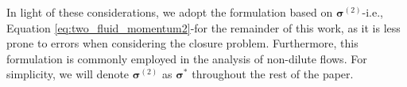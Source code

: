 
In light of these considerations, we adopt the formulation based on $\bm \sigma^{(2)}$-i.e., Equation \ref{eq:two_fluid_momentum2}-for the remainder of this work, as it is less prone to errors when considering the closure problem. 
Furthermore, this formulation is commonly employed in the analysis of non-dilute flows. 
For simplicity, we will denote $\bm \sigma^{(2)}$ as $\bm \sigma^{*}$ throughout the rest of the paper.
